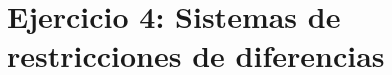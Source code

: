 \documentclass[../main.tex]{subfiles}
\begin{document}
\section{Ejercicio 4: Sistemas de restricciones de diferencias}
\label{sec:ej4}
\end{document}
